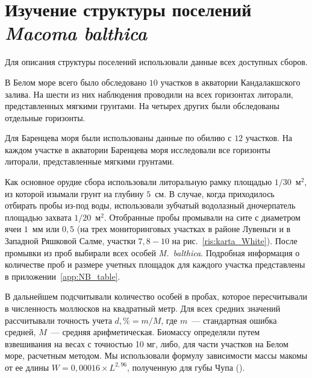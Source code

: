 
\afterpage{\clearpage}	

	\section{Изучение структуры поселений {\it Macoma balthica}}
Для описания структуры поселений использовали данные всех доступных сборов.

В Белом море всего было обследовано $10$ участков в акватории Кандалакшского залива. 
На шести из них наблюдения проводили на всех горизонтах литорали, представленных мягкими грунтами.
На четырех других были обследованы отдельные горизонты. 

Для Баренцева моря были использованы данные по обилию с $12$ участков. 
На каждом участке в акватории Баренцева моря исследовали все  горизонты литорали, представленные мягкими грунтами.  

Как основное орудие сбора использовали литоральную рамку площадью $1/30$~м$^2$, из которой изымали грунт на глубину $5$~см. 
В случае, когда приходилось отбирать пробы из-под воды, использовали зубчатый водолазный дночерпатель площадью захвата $1/20$~м$^2$.
Отобранные пробы промывали на сите с диаметром ячеи $1$~мм или $0,5$ (на трех мониторинговых участках в районе Лувеньги и в Западной Ряшковой Салме, участки $7, 8 - 10$ на рис.~\ref{ris:karta_White}). 
После промывки из   проб   выбирали   всех   особей  {\it M.~balthica}.
Подробная информация о количестве проб и размере учетных площадок для каждого участка представлены в приложении~\ref{app:NB_table}.

В дальнейшем подсчитывали количество особей в пробах, которое пересчитывали в численность моллюсков на квадратный метр. 
Для всех средних значений рассчитывали точность учета $d,\% = m/M$, где $m$~--- стандартная ошибка средней, $M$~--- средняя арифметическая.
Биомассу определяли путем взвешивания на весах с точностью 10 мг, либо, для части участков на Белом море, расчетным методом.
Мы использовали формулу зависимости массы макомы от ее длины $W = 0,00016 \times L^{2,96}$, полученную для губы Чупа (\cite{Maximovich_et_al_1993}).


